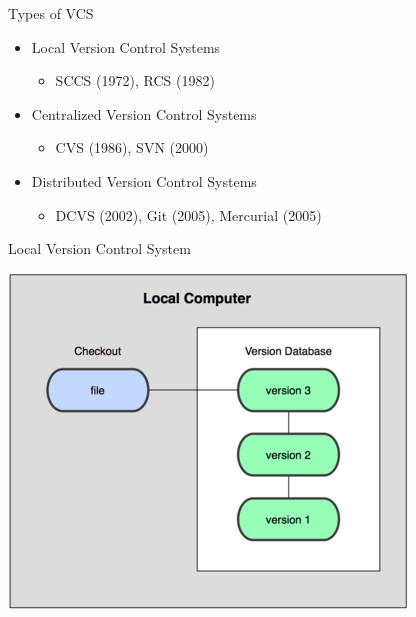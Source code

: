 \documentclass[14pt]{beamer}
\begin{document}
\begin{frame}{Types of VCS }
  \begin{itemize}
  \item Local Version Control Systems
    \begin{itemize}
    \item SCCS (1972), RCS (1982)
    \end{itemize}
    \pause
  \item Centralized Version Control Systems
    \begin{itemize}
    \item CVS (1986), SVN (2000)
    \end{itemize}
    \pause
  \item Distributed Version Control Systems
    \begin{itemize}
    \item DCVS (2002), Git (2005), Mercurial (2005) 
    \end{itemize}
  \end{itemize}
\end{frame}

\begin{frame}{Local Version Control System}
  \begin{center}
    \includegraphics[scale=0.5]{LocalVCS.png}
  \end{center}
\end{frame}
\end{document}
